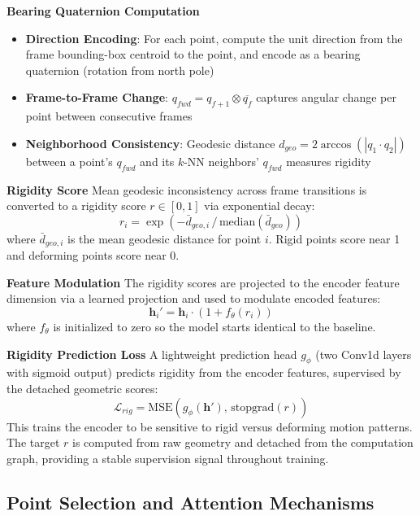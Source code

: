\documentclass[journal]{IEEEtran}
\theoremstyle{plain}
\begin{document}
\textbf{Bearing Quaternion Computation}
\begin{itemize}
    \item \textbf{Direction Encoding}: For each point, compute the unit direction from the frame bounding-box centroid to the point, and encode as a bearing quaternion (rotation from north pole)
    \item \textbf{Frame-to-Frame Change}: $q_{fwd} = q_{f+1} \otimes \overline{q_f}$ captures angular change per point between consecutive frames
    \item \textbf{Neighborhood Consistency}: Geodesic distance $d_{geo} = 2\arccos(|q_1 \cdot q_2|)$ between a point's $q_{fwd}$ and its $k$-NN neighbors' $q_{fwd}$ measures rigidity
\end{itemize}

\textbf{Rigidity Score}
Mean geodesic inconsistency across frame transitions is converted to a rigidity score $r \in [0, 1]$ via exponential decay:
\begin{equation}
    r_i = \exp\left(-\bar{d}_{geo,i} \,/\, \text{median}(\bar{d}_{geo})\right)
\end{equation}
where $\bar{d}_{geo,i}$ is the mean geodesic distance for point $i$. Rigid points score near 1 and deforming points score near 0.

\textbf{Feature Modulation}
The rigidity scores are projected to the encoder feature dimension via a learned projection and used to modulate encoded features:
\begin{equation}
    \mathbf{h}_i' = \mathbf{h}_i \cdot (1 + f_\theta(r_i))
\end{equation}
where $f_\theta$ is initialized to zero so the model starts identical to the baseline.

\textbf{Rigidity Prediction Loss}
A lightweight prediction head $g_\phi$ (two Conv1d layers with sigmoid output) predicts rigidity from the encoder features, supervised by the detached geometric scores:
\begin{equation}
    \mathcal{L}_{rig} = \text{MSE}(g_\phi(\mathbf{h}'), \, \text{stopgrad}(r))
\end{equation}
This trains the encoder to be sensitive to rigid versus deforming motion patterns. The target $r$ is computed from raw geometry and detached from the computation graph, providing a stable supervision signal throughout training.

\subsection{Point Selection and Attention Mechanisms}
\end{document}
